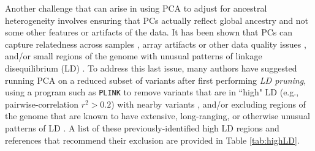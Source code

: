 \documentclass[12pt]{article}
\newcommand{\add}[1]{{\color{red}{[... #1 ...]}}}
\begin{document}
Another challenge that can arise in using PCA to adjust for ancestral heterogeneity involves ensuring that PCs actually reflect global ancestry and not some other features or artifacts of the data. 
It has been shown that PCs can capture relatedness across samples \citep{patterson2006, price2010, abdellaoui2013, conomos2015}, array artifacts or other data quality issues \citep{patterson2006, eigenstrat, price2010, weale2010}, and/or small regions of the genome with unusual patterns of linkage disequilibrium (LD) \citep{patterson2006, eigenstrat, wellcome2007, tian2008, price2008, price2010, weale2010, zou2010, laurie2010, abdellaoui2013, prive2020}. 
To address this last issue, many authors have suggested running PCA on a reduced subset of variants after first performing \textit{LD pruning}, using a program such as \texttt{PLINK} \citep{plink} to remove variants that are in ``high" LD (e.g., pairwise-correlation $r^2 > 0.2$) with nearby variants  \citep{wellcome2007, fellay2007, novembre2008, yu2008, nelson2008, anderson2010, weale2010, laurie2010, abdellaoui2013, zhang2013, conomos2015, reed2015, galinsky2016, conomos2016, daya2019}, and/or excluding regions of the genome that are known to have extensive, long-ranging, or otherwise unusual patterns of LD \citep{wellcome2007,  fellay2007, novembre2008, price2008, anderson2010, weale2010, raska2012, conomos2016}. 
A list of these previously-identified high LD regions and references that recommend their exclusion are provided in Table \ref{tab:highLD}.
\end{document}
